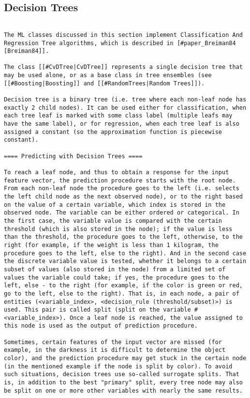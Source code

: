 \subsection{Decision Trees}
\begin{verbatim}

The ML classes discussed in this section implement Classification And Regression Tree algorithms, which is described in [#paper_Breiman84 [Breiman84]].

The class [[#CvDTree|CvDTree]] represents a single decision tree that may be used alone, or as a base class in tree ensembles (see [[#Boosting|Boosting]] and [[#RandomTrees|Random Trees]]).

Decision tree is a binary tree (i.e. tree where each non-leaf node has exactly 2 child nodes). It can be used either for classification, when each tree leaf is marked with some class label (multiple leafs may have the same label), or for regression, when each tree leaf is also assigned a constant (so the approximation function is piecewise constant).

==== Predicting with Decision Trees ====

To reach a leaf node, and thus to obtain a response for the input feature vector, the prediction procedure starts with the root node. From each non-leaf node the procedure goes to the left (i.e. selects the left child node as the next observed node), or to the right based on the value of a certain variable, which index is stored in the observed node. The variable can be either ordered or categorical. In the first case, the variable value is compared with the certain threshold (which is also stored in the node); if the value is less than the threshold, the procedure goes to the left, otherwise, to the right (for example, if the weight is less than 1 kilogram, the procedure goes to the left, else to the right). And in the second case the discrete variable value is tested, whether it belongs to a certain subset of values (also stored in the node) from a limited set of values the variable could take; if yes, the procedure goes to the left, else - to the right (for example, if the color is green or red, go to the left, else to the right). That is, in each node, a pair of entities (<variable_index>, <decision_rule (threshold/subset)>) is used. This pair is called split (split on the variable #<variable_index>). Once a leaf node is reached, the value assigned to this node is used as the output of prediction procedure.

Sometimes, certain features of the input vector are missed (for example, in the darkness it is difficult to determine the object color), and the prediction procedure may get stuck in the certain node (in the mentioned example if the node is split by color). To avoid such situations, decision trees use so-called surrogate splits. That is, in addition to the best "primary" split, every tree node may also be split on one or more other variables with nearly the same results.


\end{verbatim}
